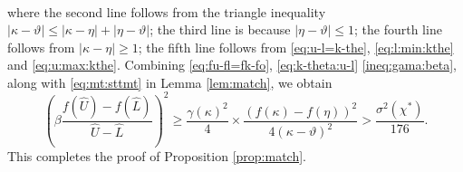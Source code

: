 \documentclass[onecolumn,letterpaper]{IEEEtran}
\newcommand{\plsize}{{\chi}}
\newcommand{\var}{{\sigma^{2}}}
\newcommand{\nan}{{\kappa}}
\newcommand{\apn}{{\gamma}}
\newcommand{\mnp}{{\vartheta}}
\newcommand{\arb}{{\eta}}
\newcommand{\lwm}{{\hat{L}}}
\newcommand{\upm}{{\hat{U}}}
\newcommand{\bet}{{\beta}}
\begin{document}
\begin{IEEEproof}
\begin{align}
\end{align}
where the second line follows from the triangle inequality $|\nan-\mnp|\leq |\nan-\arb| + |\arb-\mnp|$; the third line is because $|\arb-\mnp |\leq 1$;
the fourth line follows from $|\nan-\arb|\geq 1$;
the fifth line follows from \eqref{eq:u-l=k-the}, \eqref{eq:l:min:kthe} and \eqref{eq:u:max:kthe}.
Combining \eqref{eq:fu-fl=fk-fo}, \eqref{eq:k-theta:u-l} \eqref{ineq:gama:beta}, along with \eqref{eq:mt:sttmt} in Lemma \ref{lem:match}, we obtain
\begin{equation}
  \left(  \bet \frac{f(\upm)-f(\lwm)}{\upm-\lwm} \right)^2 \geq \frac {\apn(\nan)^2}{4} \times\frac{(f(\nan)-f(\arb))^2}{4(\nan-\mnp)^2} > \frac{\var(\plsize^{*})}{176}.
\end{equation}
This completes the proof of Proposition \ref{prop:match}.
\end{IEEEproof}
\end{document}
